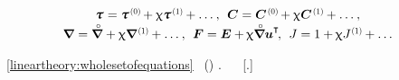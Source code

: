 \nopagebreak\vspace{-0.1em}\begin{equation*}
\begin{array}{c}
\cauchystress \hspace{.1ex} = \cauchystress^{\hspace{.2ex}\scalebox{0.66}{(0)}} \hspace{-0.2ex} + \smallparameter \cauchystress^{\hspace{.2ex}\scalebox{0.66}{(1)}} \hspace{-0.1ex} + \ldots \hspace{.1ex},
\:\:
\bm{C} = \bm{C}^{\hspace{.2ex}\scalebox{0.66}{(0)}} \hspace{-0.2ex} + \smallparameter \bm{C}^{\hspace{.2ex}\scalebox{0.66}{(1)}} \hspace{-0.1ex} + \ldots \hspace{.1ex} ,
\\[.1em]
%
\boldnabla \hspace{.1ex} = \boldnablacircled \hspace{.1ex} + \smallparameter \boldnabla^{\hspace{.2ex}\scalebox{0.66}{(1)}} \hspace{-0.1ex} + \ldots \hspace{.1ex} , \:\:
\bm{F} = \UnitDyad + \hspace{-0.1ex} \smallparameter \boldnablacircled {\bm{u}}^{\T} \hspace{-0.3ex},
\:\:
J = 1 + \hspace{-0.1ex} \smallparameter J^{\hspace{.1ex}\scalebox{0.66}{(1)}} \hspace{-0.1ex} + \ldots
\end{array}
\end{equation*}

\vspace{-0.1em}\noindent
{}~\eqref{lineartheory:wholesetofequations}
~()
.
~~\cite{truesdell-firstcourse}
[.]

